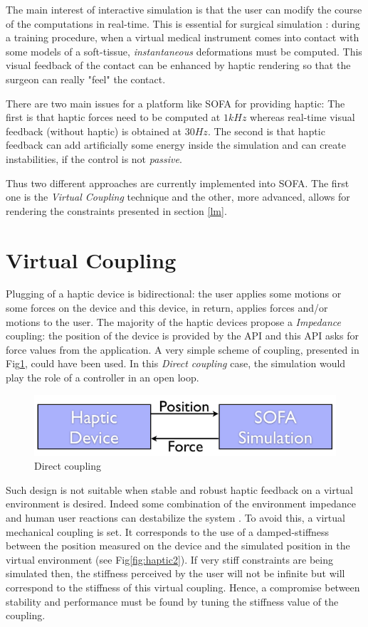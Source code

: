 The main interest of interactive simulation is that the user can modify the course of the computations in real-time.
This is essential for surgical simulation : during a training procedure, when a virtual medical instrument comes into contact with some models of a soft-tissue, \emph{instantaneous} deformations must be computed.
This visual feedback of the contact can be enhanced by haptic rendering so that the surgeon can really "feel" the contact.

There are two main issues for a platform like SOFA for providing haptic: The first is that haptic forces need to be computed at $1kHz$ whereas real-time visual feedback (without haptic) is obtained at $30Hz$. The second is that haptic feedback can add artificially some energy inside the simulation and can create instabilities, if the control is not \emph{passive}. 

Thus two different approaches are currently implemented into SOFA. The first one is the \emph{Virtual Coupling} technique and the other, more advanced, allows for rendering the constraints presented in section \ref{lm}.



\section{Virtual Coupling} Plugging of a haptic device is bidirectional: the user applies some motions or some forces on the device and this device, in return, applies forces and/or motions to the user.
The majority of the haptic devices propose a \emph{Impedance} coupling: the position of the device is provided by the API and this API asks for force values from the application.
A very simple scheme of coupling, presented in Fig\ref{fig:haptic1}, could have been used.
In this \emph{Direct coupling} case, the simulation would play the role of a controller in an open loop. 

\begin{figure}
\centering
 \includegraphics[width=0.7\linewidth]{haptic1.png}
 \caption{Direct coupling}
 \label{fig:haptic1}
\end{figure}

Such design is not suitable when stable and robust haptic feedback on a virtual environment is desired. Indeed some combination of the environment impedance and human user reactions can destabilize the system \cite{Adams99}. 
To avoid this, a virtual mechanical coupling is set. It corresponds to the use of a damped-stiffness between the position measured on the device and the simulated position in the virtual environment (see Fig\ref{fig:haptic2}). If very stiff constraints are being simulated then, the stiffness perceived by the user will not be infinite but will correspond to the stiffness of this virtual coupling. 
Hence, a compromise between stability and performance must be found by tuning the stiffness value of the coupling.

